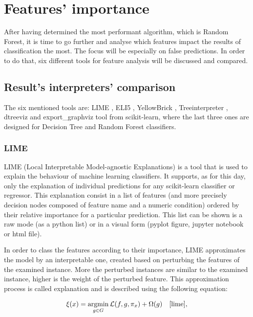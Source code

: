 \chapter{Features' importance}

After having determined the most performant algorithm, which is Random Forest, it is time to go further and analyse which features impact the results of classification the most. The focus will be especially on false predictions. In order to do that, six different tools for feature analysis will be discussed and compared.

\section{Result's interpreters' comparison}

The six mentioned tools are: LIME \cite{lime}, ELI5 \cite{mikhail_korobov_eli5_nodate}, YellowBrick \cite{bengfort_yellowbrick_2018}, Treeinterpreter \cite{ando_saabas_treeinterpreter_nodate}, dtreeviz \cite{terence_parr_dtreeviz_nodate} and export\_graphviz tool from scikit-learn, where the last three ones are designed for Decision Tree and Random Forest classifiers.

\subsection{LIME} 
LIME (Local Interpretable Model-agnostic Explanations) is a tool that is used to explain the behaviour of machine learning classifiers. It supports, as for this day, only the explanation of individual predictions for any scikit-learn classifier or regressor. This explanation consist in a list of features (and more precisely decision nodes composed of feature name and a numeric condition) ordered by their relative importance for a particular prediction. This list can be shown is a raw mode (as a python list) or in a visual form (pyplot figure, jupyter notebook or html file).

In order to class the features according to their importance, LIME approximates the model by an interpretable one, created based on perturbing the features of the examined instance. More the perturbed instances are similar to the examined instance, higher is the weight of the perturbed feature. This approximation process is called explanation and is described using the following equation:

\begin{equation}
    \xi(x) = \operatorname*{argmin}_{g \in G} \mathcal{L}(f, g, \pi_x) + \Omega(g)\quad\cite{lime},
\end{equation}

